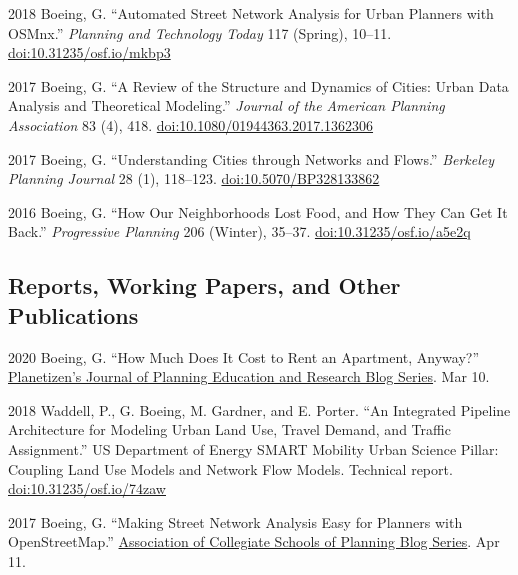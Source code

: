 \documentclass[12pt,letterpaper]{report}
\begin{document}
    \begin{tablist}

        \item[2018] \tab Boeing, G. \enquote{Automated Street Network Analysis for Urban Planners with OSMnx.} \textit{Planning and Technology Today} 117 (Spring), 10--11. \href{https://doi.org/10.31235/osf.io/mkbp3}{doi:10.31235/osf.io/mkbp3}

        \item[2017] \tab Boeing, G. \enquote{A Review of the Structure and Dynamics of Cities: Urban Data Analysis and Theoretical Modeling.} \textit{Journal of the American Planning Association} 83 (4), 418. \href{https://doi.org/10.1080/01944363.2017.1362306}{doi:10.1080/01944363.2017.1362306}

        \item[2017] \tab Boeing, G. \enquote{Understanding Cities through Networks and Flows.} \textit{Berkeley Planning Journal} 28 (1), 118--123. \href{https://doi.org/10.5070/BP328133862}{doi:10.5070/BP328133862}

        \item[2016] \tab Boeing, G. \enquote{How Our Neighborhoods Lost Food, and How They Can Get It Back.} \textit{Progressive Planning} 206 (Winter), 35--37. \href{https://doi.org/10.31235/osf.io/a5e2q}{doi:10.31235/osf.io/a5e2q}

    \end{tablist}



    \subsection*{Reports, Working Papers, and Other Publications}

    \begin{tablist}

        \item[2020] \tab Boeing, G. \enquote{How Much Does It Cost to Rent an Apartment, Anyway?} \href{https://www.planetizen.com/blogs/108691-how-much-does-it-cost-rent-apartment-anyway}{Planetizen's Journal of Planning Education and Research Blog Series}. Mar 10.

        \item[2018] \tab Waddell, P., G. Boeing, M. Gardner, and E. Porter. \enquote{An Integrated Pipeline Architecture for Modeling Urban Land Use, Travel Demand, and Traffic Assignment.} US Department of Energy SMART Mobility Urban Science Pillar: Coupling Land Use Models and Network Flow Models. Technical report. \href{https://doi.org/10.31235/osf.io/74zaw}{doi:10.31235/osf.io/74zaw}

        \item[2017] \tab Boeing, G. \enquote{Making Street Network Analysis Easy for Planners with OpenStreetMap.} \href{https://www.acsp.org/blogpost/1347075/272890/Making-Street-Network-Analysis-Easy-for-Planners-with-OpenStreetMap}{Association of Collegiate Schools of Planning Blog Series}. Apr 11.

    \end{tablist}
\end{document}
